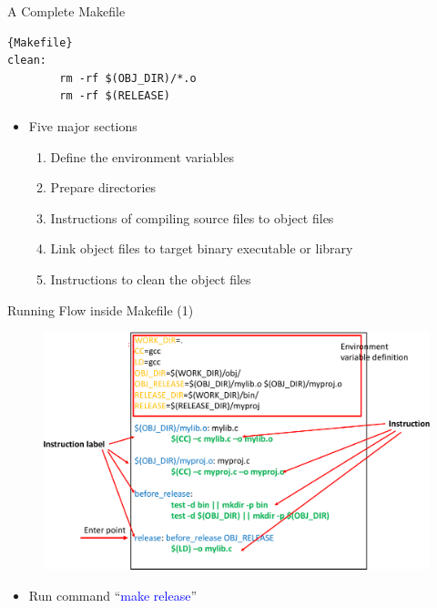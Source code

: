 \begin{frame}[fragile]{A Complete Makefile}

\begin{lstlisting}[linewidth=0.9\linewidth, xleftmargin=0.05\linewidth]{Makefile}
clean:
        rm -rf $(OBJ_DIR)/*.o
        rm -rf $(RELEASE)
\end{lstlisting}
\begin{itemize}
	\item {Five major sections}
	\begin{enumerate}
		\item {Define the environment variables}
		\item {Prepare directories}
		\item {Instructions of compiling source files to object files}
		\item {Link object files to target binary executable or library}
		\item {Instructions to clean the object files}
	\end{enumerate}
\end{itemize}
\end{frame}


\begin{frame}{Running Flow inside Makefile (1)}
\begin{figure}
	\includegraphics[width=0.80\linewidth]{figs/make1.pdf}
\end{figure}
\begin{itemize}
	\item {Run command ``\textcolor{blue}{make release}''}
\end{itemize}
\end{frame}

